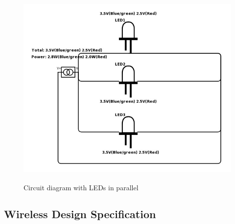 \documentclass[12pt]{article}
\begin{document}
{{\begin{itemize}
\begin{itemize}
							\begin{figure}[!htb]
								\centering
								\includegraphics[height = 100mm]{assets/ParallelLED.jpg}
								\caption{Circuit diagram with LEDs in parallel \label{overflow}}
							\end{figure}
					\end{itemize}
			\end{itemize}
	\clearpage

	\subsection{Wireless Design Specification}
	
}}
\end{document}
